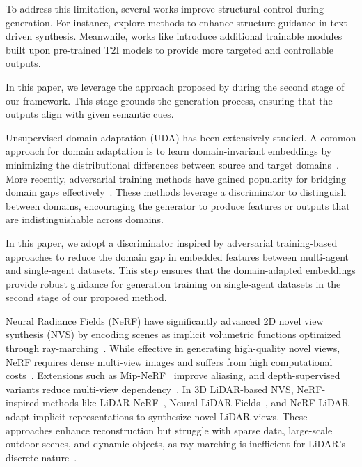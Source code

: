 To address this limitation, several works improve structural control during generation. For instance, \citep{wang2022pretraining,hertzprompt,feng2023training,balaji2022ediff} explore methods to enhance structure guidance in text-driven synthesis. Meanwhile, works like \citep{mou2024t2i,li2025controlnet,zhang2023adding} introduce additional trainable modules built upon pre-trained T2I models to provide more targeted and controllable outputs.

In this paper, we leverage the approach proposed by \citep{mou2024t2i} during the second stage of our framework. This stage grounds the generation process, ensuring that the outputs align with given semantic cues.



Unsupervised domain adaptation (UDA) has been extensively studied. A common approach for domain adaptation is to learn domain-invariant embeddings by minimizing the distributional differences between source and target domains~\citep{long2015learning,sun2016deep,tzeng2015simultaneous,tzeng2014deep}. More recently, adversarial training methods have gained popularity for bridging domain gaps effectively~\citep{ajakan2014domain,ganin2015unsupervised,ganin2016domain,tzeng2017adversarial,isola2017image,lim2017geometric}. These methods leverage a discriminator to distinguish between domains, encouraging the generator to produce features or outputs that are indistinguishable across domains.

In this paper, we adopt a discriminator inspired by adversarial training-based approaches to reduce the domain gap in embedded features between multi-agent and single-agent datasets. This step ensures that the domain-adapted embeddings provide robust guidance for generation training on single-agent datasets in the second stage of our proposed method.


Neural Radiance Fields (NeRF) have significantly advanced 2D novel view synthesis (NVS) by encoding scenes as implicit volumetric functions optimized through ray-marching~\citep{mildenhall2021nerf}. While effective in generating high-quality novel views, NeRF requires dense multi-view images and suffers from high computational costs~\citep{barron2021mip, barron2022mip}. Extensions such as Mip-NeRF~\citep{barron2021mip} improve aliasing, and depth-supervised variants reduce multi-view dependency~\citep{deng2022depth, roessle2022dense}.
In 3D LiDAR-based NVS, NeRF-inspired methods like LiDAR-NeRF~\citep{tao2024lidarnerf}, Neural LiDAR Fields~\citep{huang2023neural}, and NeRF-LiDAR~\citep{zhang2024nerf} adapt implicit representations to synthesize novel LiDAR views. These approaches enhance reconstruction but struggle with sparse data, large-scale outdoor scenes, and dynamic objects, as ray-marching is inefficient for LiDAR’s discrete nature~\citep{tao2024lidarnerf}.

